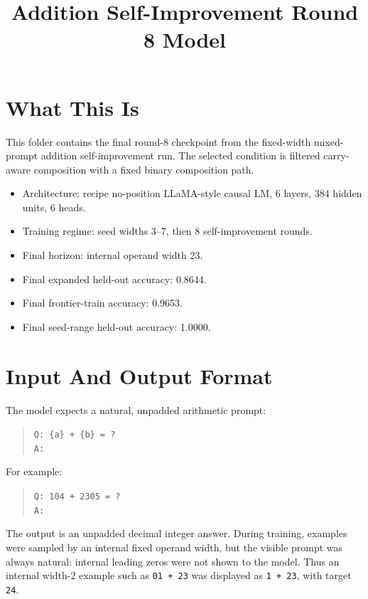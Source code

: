 \documentclass[11pt]{article}
\title{Addition Self-Improvement Round 8 Model}
\author{}
\date{}
\begin{document}
\maketitle

\section*{What This Is}

This folder contains the final round-8 checkpoint from the fixed-width mixed-prompt
addition self-improvement run. The selected condition is filtered carry-aware
composition with a fixed binary composition path.

\begin{itemize}
  \item Architecture: recipe no-position LLaMA-style causal LM, 6 layers, 384 hidden units, 6 heads.
  \item Training regime: seed widths 3--7, then 8 self-improvement rounds.
  \item Final horizon: internal operand width 23.
  \item Final expanded held-out accuracy: 0.8644.
  \item Final frontier-train accuracy: 0.9653.
  \item Final seed-range held-out accuracy: 1.0000.
\end{itemize}

\section*{Input And Output Format}

The model expects a natural, unpadded arithmetic prompt:

\begin{quote}
\texttt{Q: \{a\} + \{b\} = ?}\\
\texttt{A:}
\end{quote}

For example:

\begin{quote}
\texttt{Q: 104 + 2305 = ?}\\
\texttt{A:}
\end{quote}

The output is an unpadded decimal integer answer. During training, examples were
sampled by an internal fixed operand width, but the visible prompt was always natural:
internal leading zeros were not shown to the model. Thus an internal width-2 example
such as \texttt{01 + 23} was displayed as \texttt{1 + 23}, with target \texttt{24}.
\end{document}
